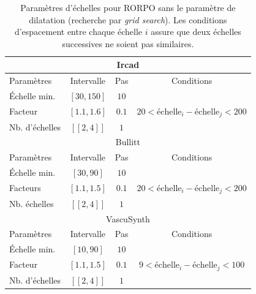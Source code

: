 \begin{table}[H]
  \caption{ Paramètres d'échelles pour RORPO sans le paramètre de dilatation (recherche par \textit{grid search}). Les conditions d'espacement entre chaque échelle $i$ assure que deux échelles successives ne soient pas similaires.}
  \label{tab:SS_interval_RORPO}
  \begin{center}
    \begin{tabular}{  l  c  c  c }
      \hline
      \multicolumn{4}{c}{Ircad}\\
      \hline
      Paramètres & Intervalle & Pas & Conditions \\
      \hline
      Échelle min. & $[30,150]$ & $10$ & \\
      Facteur & $[1.1,1.6]$ & $0.1$ & $20 < \textrm{échelle}_{i} - \textrm{échelle}_{j} < 200$ \\ 
      Nb. d'échelles & $[\![2,4]\!]$ & $1$ & \\
      \hline
      \hline
      \multicolumn{4}{c}{Bullitt}\\
      \hline
      Paramètres & Intervalle & Pas & Conditions \\
      \hline
      Échelle min. & $[30,90]$ & $10$ & \\
      
      Facteurs & $[1.1,1.5]$  & $0.1$ & $ 20 < \textrm{échelle}_{i} - \textrm{échelle}_{j} < 200$ \\
      Nb. échelles & $[\![2,4]\!]$ & $1$ & \\
      \hline
      \hline
      \multicolumn{4}{c}{VascuSynth}\\
      \hline
      Paramètres & Intervalle & Pas & Conditions \\
      \hline
      Échelle min. & $[10,90]$ & $10$ & \\
      
      Facteur & $[1.1,1.5]$  &  $0.1$ & $ 9 < \textrm{échelle}_{i} - \textrm{échelle}_{j} < 100$ \\
      
      Nb. d'échelles & $[\![2,4]\!]$ & $1$ & \\
      \hline
    \end{tabular}
  \end{center}
\end{table}

